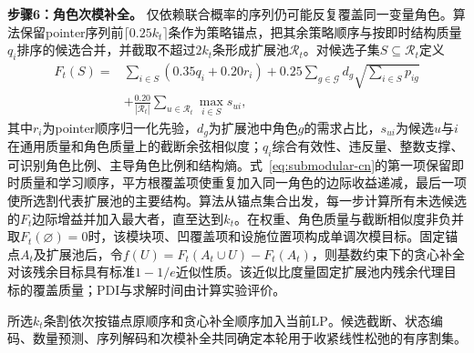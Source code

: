 \documentclass[final,5p,times,twocolumn]{elsarticle}
\begin{document}
\noindent\textbf{步骤6：角色次模补全。} 仅依赖联合概率的序列仍可能反复覆盖同一变量角色。算法保留pointer序列前$\lceil0.25k_t\rceil$条作为策略锚点，把其余策略顺序与按即时结构质量$q_i$排序的候选合并，并截取不超过$2k_t$条形成扩展池$\mathcal R_t$。对候选子集$S\subseteq\mathcal R_t$定义
\begin{equation}
\begin{aligned}
F_t(S)={}&\sum_{i\in S}(0.35q_i+0.20r_i)
+0.25\sum_{g\in\mathcal G}d_g\sqrt{\sum_{i\in S}p_{ig}}\\
&+\frac{0.20}{|\mathcal R_t|}\sum_{u\in\mathcal R_t}\max_{i\in S}s_{ui},
\end{aligned}
\label{eq:submodular-cn}
\end{equation}
其中$r_i$为pointer顺序归一化先验，$d_g$为扩展池中角色$g$的需求占比，$s_{ui}$为候选$u$与$i$在通用质量和角色质量上的截断余弦相似度；$q_i$综合有效性、违反量、整数支撑、可识别角色比例、主导角色比例和结构熵。式~\eqref{eq:submodular-cn}的第一项保留即时质量和学习顺序，平方根覆盖项使重复加入同一角色的边际收益递减，最后一项使所选割代表扩展池的主要结构。算法从锚点集合出发，每一步计算所有未选候选的$F_t$边际增益并加入最大者，直至达到$k_t$。在权重、角色质量与截断相似度非负并取$F_t(\varnothing)=0$时，该模块项、凹覆盖项和设施位置项构成单调次模目标。固定锚点$A_t$及扩展池后，令$f(U)=F_t(A_t\cup U)-F_t(A_t)$，则基数约束下的贪心补全对该残余目标具有标准$1-1/e$近似性质\citep{nemhauser1978analysis}。该近似比度量固定扩展池内残余代理目标的覆盖质量；PDI与求解时间由计算实验评价。

所选$k_t$条割依次按锚点原顺序和贪心补全顺序加入当前LP。候选截断、状态编码、数量预测、序列解码和次模补全共同确定本轮用于收紧线性松弛的有序割集。
\end{document}
